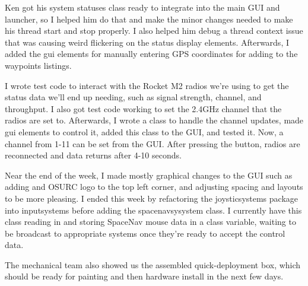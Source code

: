 \begin{itemize}
\begin{itemize}
\begin{itemize}
Ken got his system statuses class ready to integrate into the main GUI and launcher, so I helped him do that and make the minor changes needed to make his thread start and stop properly. I also helped him debug a thread context issue that was causing weird flickering on the status display elements. Afterwards, I added the gui elements for manually entering GPS coordinates for adding to the waypoints listings.  

I wrote test code to interact with the Rocket M2 radios we're using to get the status data we'll end up needing, such as signal strength, channel, and throughput. I also got test code working to set the 2.4GHz channel that the radios are set to. Afterwards, I wrote a class to handle the channel updates, made gui elements to control it, added this class to the GUI, and tested it. Now, a channel from 1-11 can be set from the GUI. After pressing the button, radios are reconnected and data returns after 4-10 seconds.   

Near the end of the week, I made mostly graphical changes to the GUI such as adding and OSURC logo to the top left corner, and adjusting spacing and layouts to be more pleasing. I ended this week by refactoring the joysticsystems package into inputsystems before adding the spacenavsysystem class. I currently have this class reading in and storing SpaceNav mouse data in a class variable, waiting to be broadcast to appropriate systems once they're ready to accept the control data. 

The mechanical team also showed us the assembled quick-deployment box, which should be ready for painting and then hardware install in the next few days. 
      \end{itemize}
	\end{itemize}

\end{itemize}




